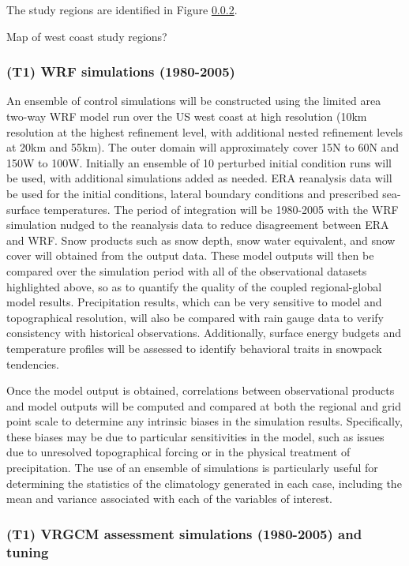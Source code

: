 \documentclass[11pt]{article}
\begin{document}
The study regions are identified in Figure \ref{}.

{\color{red} Map of west coast study regions?}

\subsubsection{(T1) WRF simulations (1980-2005)}

An ensemble of control simulations will be constructed using the limited area two-way WRF model run over the US west coast at high resolution (10km resolution at the highest refinement level, with additional nested refinement levels at 20km and 55km). The outer domain will approximately cover 15N to 60N and 150W to 100W. Initially an ensemble of 10 perturbed initial condition runs will be used, with additional simulations added as needed. ERA reanalysis data will be used for the initial conditions, lateral boundary conditions and prescribed sea-surface temperatures. The period of integration will be 1980-2005 with the WRF simulation nudged to the reanalysis data to reduce disagreement between ERA and WRF. Snow products such as snow depth, snow water equivalent, and snow cover will obtained from the output data.  These model outputs will then be compared over the simulation period with all of the observational datasets highlighted above, so as to quantify the quality of the coupled regional-global model results. Precipitation results, which can be very sensitive to model and topographical resolution, will also be compared with rain gauge data to verify consistency with historical observations.  Additionally, surface energy budgets and temperature profiles will be assessed to identify behavioral traits in snowpack tendencies.

Once the model output is obtained, correlations between observational products and model outputs will be computed and compared at both the regional and grid point scale to determine any intrinsic biases in the simulation results. Specifically, these biases may be due to particular sensitivities in the model, such as issues due to unresolved topographical forcing or in the physical treatment of precipitation. The use of an ensemble of simulations is particularly useful for determining the statistics of the climatology generated in each case, including the mean and variance associated with each of the variables of interest.

\subsubsection{(T1) VRGCM assessment simulations (1980-2005) and tuning}
\end{document}

